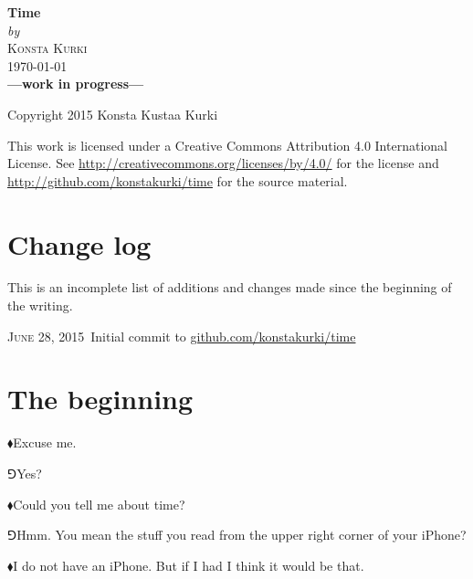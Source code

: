 \documentclass[11pt,oneside%
]{memoir}
\newenvironment{narration}{\begin{em}}{\end{em}}
\newcommand{\hea}{\(\blacklozenge\)\;}
\newcommand{\heb}{\(\Game\)\;}
\begin{document}
\frontmatter
\begin{titlingpage}
	\begin{centering}
		\HUGE\textbf{Time}\\
		\vspace{0.4em}
		\normalsize\emph{by}\\
		\vspace{0.4em}
		\textsc{Konsta Kurki}\\
		\vspace{0.4em}
		\textsc{\today}\\
		\vspace{5em}
		\textbf{---work in progress---}\\
	\end{centering}
	\vfill

	Copyright {\textcopyright} 2015 Konsta Kustaa Kurki

	This work is licensed under a Creative Commons Attribution 4.0 International License. See \url{http://creativecommons.org/licenses/by/4.0/} for the license and \url{http://github.com/konstakurki/time} for the source material.
\end{titlingpage}
\chapter{Change log}
\begin{narration}
This is an incomplete list of additions and changes made since the beginning of the writing.
\end{narration}


\textsc{June 28, 2015}\, Initial commit to \url{github.com/konstakurki/time}

\newpage
\tableofcontents
\mainmatter
\chapter{The beginning}
\hea Excuse me.

\heb Yes?

\hea Could you tell me about time?

\heb Hmm. You mean the stuff you read from the upper right corner of your iPhone?

\hea I do not have an iPhone. But if I had I think it would be that.
\end{document}
